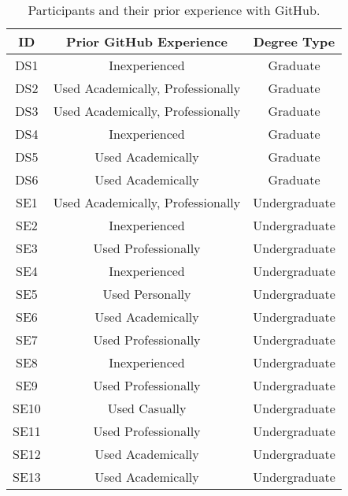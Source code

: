 \begin{table}[h]
    \vspace{-10pt}
        \caption{Participants and their prior experience with GitHub.}\label{table:interviews:students}
    \vspace{-10pt}
    \begin{center}
        \begin{tabular}{c | c | c}
            \hline
            ID & Prior GitHub Experience & Degree Type \\
            \hline
            DS1 & Inexperienced & Graduate \\ \hline
            DS2 & Used Academically, Professionally & Graduate \\ \hline
            DS3 & Used Academically, Professionally & Graduate \\ \hline
            DS4 & Inexperienced & Graduate \\ \hline
            DS5 & Used Academically & Graduate \\ \hline
            DS6 & Used Academically & Graduate \\ \hline
            SE1 & Used Academically, Professionally & Undergraduate \\ \hline
            SE2 & Inexperienced & Undergraduate \\ \hline
            SE3 & Used Professionally & Undergraduate \\ \hline
            SE4 & Inexperienced & Undergraduate \\ \hline
            SE5 & Used Personally & Undergraduate \\ \hline
            SE6 & Used Academically & Undergraduate \\ \hline
            SE7 & Used Professionally & Undergraduate \\ \hline
            SE8 & Inexperienced & Undergraduate \\ \hline
            SE9 & Used Professionally & Undergraduate \\ \hline
            SE10 & Used Casually & Undergraduate \\ \hline
            SE11 & Used Professionally & Undergraduate \\ \hline
            SE12 & Used Academically & Undergraduate \\ \hline
            SE13 & Used Academically & Undergraduate \\ \hline
        \end{tabular}
    \end{center}
    \vspace{-12pt}
\end{table}

